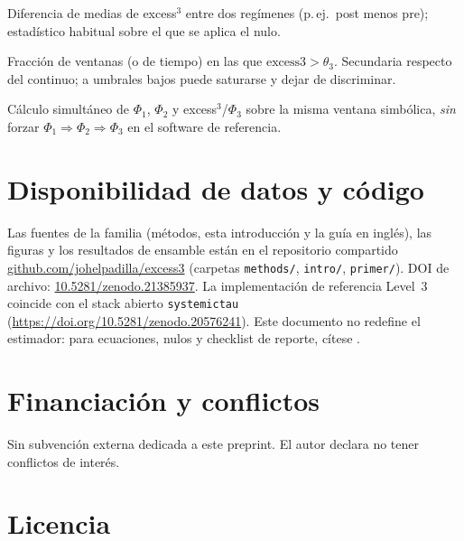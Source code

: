 \documentclass[11pt,a4paper]{article}
\newcommand{\ExcessThreeRepo}{https://github.com/johelpadilla/excess3}
\newcommand{\ExcessThreeRepoShort}{github.com/johelpadilla/excess3}
\newcommand{\ExcessThreeDOI}{10.5281/zenodo.21385937}
\newcommand{\ExcessThreeDOIURL}{https://doi.org/10.5281/zenodo.21385937}
\begin{document}
\begin{description}[style=nextline,leftmargin=1em,itemsep=5pt]
  \item[Contraste $\Delta\mathrm{excess3}$]
    Diferencia de medias de excess$^3$ entre dos reg\'imenes (p.\,ej.\ post
    menos pre); estad\'istico habitual sobre el que se aplica el nulo.

  \item[Ocupancia de $\Phi_3$]
    Fracci\'on de ventanas (o de tiempo) en las que
    $\mathrm{excess3}>\theta_3$. Secundaria respecto del continuo; a
    umbrales bajos puede saturarse y dejar de discriminar.

  \item[Anidamiento paralelo]
    C\'alculo simult\'aneo de $\Phi_1$, $\Phi_2$ y excess$^3$/$\Phi_3$ sobre
    la misma ventana simb\'olica, \emph{sin} forzar
    $\Phi_1\Rightarrow\Phi_2\Rightarrow\Phi_3$ en el software de referencia.
\end{description}

\section*{Disponibilidad de datos y c\'odigo}

Las fuentes de la familia (m\'etodos, esta introducci\'on y la gu\'ia en
ingl\'es), las figuras y los resultados de ensamble est\'an en el repositorio
compartido
\href{\ExcessThreeRepo}{\ExcessThreeRepoShort}
(carpetas \texttt{methods/}, \texttt{intro/}, \texttt{primer/}).
DOI de archivo: \href{\ExcessThreeDOIURL}{\ExcessThreeDOI}.
La implementaci\'on de referencia Level~3 coincide con el stack abierto
\texttt{systemictau} \citep{Padilla2026software}
(\url{https://doi.org/10.5281/zenodo.20576241}). Este documento no redefine
el estimador: para ecuaciones, nulos y checklist de reporte, c\'itese
\citep{Padilla2026excess3}.

\section*{Financiaci\'on y conflictos}

Sin subvenci\'on externa dedicada a este preprint. El autor declara no tener
conflictos de inter\'es.

\section*{Licencia}
\end{document}
